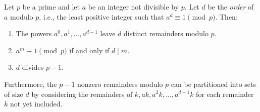 Let $p$ be a prime and let $a$ be an integer not divisible by $p$. Let $d$ be the \textit{order} of $a$ modulo $p$, i.e., the least positive integer such that $a^d \equiv 1 \pmod{p}$. Then:
\begin{enumerate}
\item The powers $a^0, a^1, \ldots, a^{d-1}$ leave $d$ distinct remainders modulo $p$.
\item $a^m \equiv 1 \pmod{p}$ if and only if $d \mid m$.
\item $d$ divides $p - 1$.
\end{enumerate}

Furthermore, the $p-1$ nonzero remainders modulo $p$ can be partitioned into sets of size $d$ by considering the remainders of $k, ak, a^2k, \ldots, a^{d-1}k$ for each remainder $k$ not yet included.
